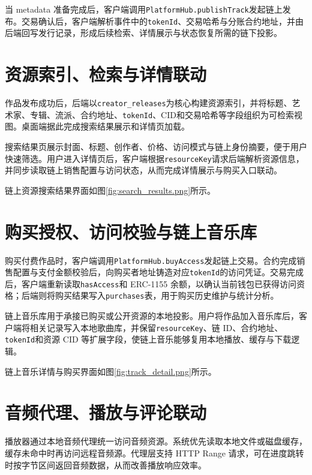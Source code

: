 当 metadata 准备完成后，客户端调用\texttt{PlatformHub.publishTrack}发起链上发布。交易确认后，客户端解析事件中的\texttt{tokenId}、交易哈希与分账合约地址，并由后端回写发行记录，形成后续检索、详情展示与状态恢复所需的链下投影。

\section{资源索引、检索与详情联动}

作品发布成功后，后端以\texttt{creator\_releases}为核心构建资源索引，并将标题、艺术家、专辑、流派、合约地址、\texttt{tokenId}、CID和交易哈希等字段组织为可检索视图。桌面端据此完成搜索结果展示和详情页加载。

搜索结果页展示封面、标题、创作者、价格、访问模式与链上身份摘要，便于用户快速筛选。用户进入详情页后，客户端根据\texttt{resourceKey}请求后端解析资源信息，并同步读取链上销售配置与访问状态，从而完成详情展示与购买入口联动。

链上资源搜索结果界面如图\ref{fig:search_results.png}所示。


\section{购买授权、访问校验与链上音乐库}

购买付费作品时，客户端调用\texttt{PlatformHub.buyAccess}发起链上交易。合约完成销售配置与支付金额校验后，向购买者地址铸造对应\texttt{tokenId}的访问凭证。交易完成后，客户端重新读取\texttt{hasAccess}和 ERC-1155 余额，以确认当前钱包已获得访问资格；后端则将购买结果写入\texttt{purchases}表，用于购买历史维护与统计分析。

链上音乐库用于承接已购买或公开资源的本地投影。用户将作品加入音乐库后，客户端将相关记录写入本地歌曲库，并保留\texttt{resourceKey}、链 ID、合约地址、\texttt{tokenId}和资源 CID 等扩展字段，使链上音乐能够复用本地播放、缓存与下载逻辑。

链上音乐详情与购买界面如图\ref{fig:track_detail.png}所示。


\section{音频代理、播放与评论联动}

播放器通过本地音频代理统一访问音频资源。系统优先读取本地文件或磁盘缓存，缓存未命中时再访问远程音频源。代理层支持 HTTP Range 请求，可在进度跳转时按字节区间返回音频数据，从而改善播放响应效率。

